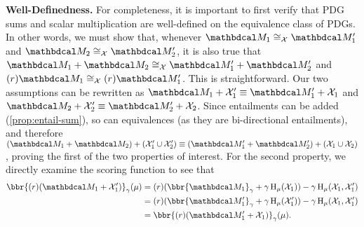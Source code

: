 \begin{subappendices}
    
    \begin{lproof}\label{proof:pdg-vecspace}
        \textbf{Well-Definedness.}
        For completeness, it is important to first verify that PDG sums and scalar multiplication are well-defined 
        on the equivalence class of PDGs.
        In other words, we must show that, whenever $\dg M_1 \cong_\X \dg M_1'$ and $\dg M_2 \cong_\X \dg M_2'$, 
        it is also true that $\dg M_1 + \dg M_2 \cong_\X \dg M_1' + \dg M_2'$ and  $(r) \dg M_1 \cong_\X (r) \dg M_1'$. 
        This is straightforward.
        Our two assumptions can be rewritten as
        $\dg M_1 + \X_1' \equiv \dg M_1' + \X_1$
        and 
        $\dg M_2 + \X_2' \equiv \dg M_2' + \X_2$. 
        Since entailments can be added (\cref{prop:entail-sum}), so can 
            equivalences (as they are bi-directional entailments), and therefore
        $(\dg M_1 + \dg M_2) + (\X_1' \cup \X_2') \equiv (\dg M_1' + \dg M_2') + (\X_1 \cup \X_2)$,
        proving the first of the two properties of interest.
        For the second property, 
        we directly examine the scoring function to see that
        \begin{align*}
            \bbr{(r) (\dg M_1 + \X_1')}_\gamma (\mu)
            &= (r) (\bbr{\dg M_1}_\gamma + \gamma \H_\mu(\X_1))  - \gamma \H_\mu(\X_1, \X_1') \\
            &= (r) (\bbr{\dg M_1'}_\gamma + \gamma \H_\mu(\X_1'))  - \gamma \H_\mu(\X_1, \X_1') \\
            &= \bbr{(r) (\dg M_1' + \X_1)}_\gamma (\mu).
        \end{align*}
        

\end{lproof}
\end{subappendices}
